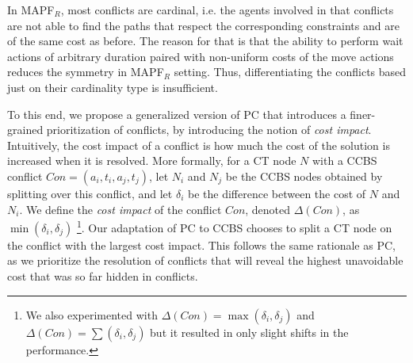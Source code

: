 \documentclass[letterpaper]{article} %
\newcommand{\cbs}{\ac{CBS}\xspace}
\newcommand{\ccbs}{\ac{CCBS}\xspace}
\newcommand{\ct}{\ac{CT}\xspace}
\newcommand{\mapfr}{{MAPF}$_R$\xspace}
\newcommand{\pc}{\ac{PC}\xspace}
\begin{document}
In \mapfr, most conflicts are cardinal, i.e. the agents involved in that conflicts are not able to find the paths that respect the corresponding constraints and are of the same cost as before. The reason for that is that the ability to perform wait actions of arbitrary duration paired with non-uniform costs of the move actions reduces the symmetry in \mapfr setting. 
Thus, differentiating the conflicts based just on their cardinality type is insufficient.


To this end, we propose a generalized version of \pc that introduces a finer-grained prioritization of conflicts, by introducing the notion of \emph{cost impact}. 
Intuitively, the cost impact of a conflict is how much the cost of the solution is increased when it is resolved. %
More formally, for a \ct node $N$ with a \ccbs conflict $Con=(a_i, t_i, a_j, t_j)$, 
let $N_i$ and $N_j$ be the \ccbs nodes obtained by splitting over this conflict, 
and let $\delta_i$ be the difference between the cost of $N$ and $N_i$. 
We define the \emph{cost impact} of the conflict $Con$, denoted $\Delta(Con)$, as $\min(\delta_i, \delta_j)$  \footnote{We also experimented with $\Delta(Con) = \max(\delta_i, \delta_j)$ and $\Delta(Con) = \sum(\delta_i, \delta_j)$ but it resulted in only  slight shifts in the performance.}.
Our adaptation of \pc to \ccbs chooses to split a \ct node on the conflict with the largest cost impact. This follows the same rationale as \pc, as we prioritize the resolution of conflicts that will
reveal the highest unavoidable cost that was so far hidden in conflicts.





\end{document}
